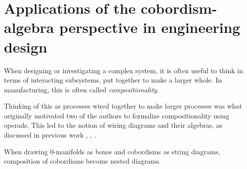 \documentclass[12pt,oneside,article,draft]{memoir}
\begin{document}
\section[Applications of the cobordism-algebra perspective]{Applications of the cobordism-algebra perspective in engineering design}

When designing or investigating a complex system, it is often useful to think in terms of interacting subsystems, put together to make a larger whole. In manufacturing, this is often called \emph{compositionality}.

Thinking of this as processes wired together to make larger processes was what originally motivated two of the authors to formalize compositionality using operads. This led to the notion of wiring diagrams and their algebras, as discussed in previous work \cite{Spivak}, \cite{Rupel-Spivak}, \cite{Vagner-Spivak-Lerman}. 
 

When drawing 0-manifolds as boxes and cobordisms as string diagrams, composition of cobordisms become nested diagrams.
\end{document}
